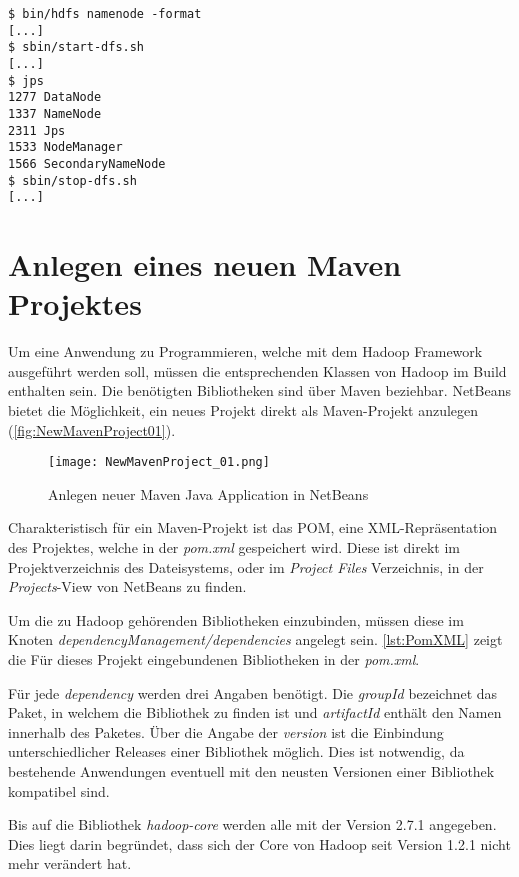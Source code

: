 \begin{lstlisting}[caption=Test der Konfiguration, label=lis:TestenDerKonf]
$ bin/hdfs namenode -format
[...]
$ sbin/start-dfs.sh
[...]
$ jps
1277 DataNode
1337 NameNode
2311 Jps
1533 NodeManager
1566 SecondaryNameNode
$ sbin/stop-dfs.sh
[...]
\end{lstlisting}


\section{Anlegen eines neuen Maven Projektes}
Um eine Anwendung zu Programmieren, welche mit dem Hadoop Framework ausgeführt werden soll, müssen die entsprechenden Klassen von Hadoop im Build enthalten sein. Die benötigten Bibliotheken sind über \gls{Maven} beziehbar. \gls{NetBeans} bietet die Möglichkeit, ein neues Projekt direkt als \gls{Maven}-Projekt anzulegen (\autoref{fig:NewMavenProject01}).

\begin{figure}[h]
	\texttt{[image: NewMavenProject\_01.png]}
	\caption{Anlegen neuer Maven Java Application in NetBeans}
	\label{fig:NewMavenProject01}
\end{figure}

Charakteristisch für ein \gls{Maven}-Projekt ist das \ac{POM}, eine XML-Repräsentation des Projektes, welche in der \textit{pom.xml} gespeichert wird. Diese ist direkt im Projektverzeichnis des Dateisystems, oder im \textit{Project Files} Verzeichnis, in der \textit{Projects}-View von \gls{NetBeans} zu finden.

Um die zu Hadoop gehörenden Bibliotheken einzubinden, müssen diese im Knoten \textit{dependencyManagement/dependencies} angelegt sein. \autoref{lst:PomXML} zeigt die Für dieses Projekt eingebundenen Bibliotheken in der \textit{pom.xml}.

Für jede \textit{dependency} werden drei Angaben benötigt. Die \textit{groupId} bezeichnet das Paket, in welchem die Bibliothek zu finden ist und \textit{artifactId} enthält den Namen innerhalb des Paketes. Über die Angabe der \textit{version} ist die Einbindung unterschiedlicher Releases einer Bibliothek möglich. Dies ist notwendig, da bestehende Anwendungen eventuell  mit den neusten Versionen einer Bibliothek kompatibel sind.

Bis auf die Bibliothek \textit{hadoop-core} werden alle mit der Version 2.7.1 angegeben. Dies liegt darin begründet, dass sich der Core von Hadoop seit Version 1.2.1 nicht mehr verändert hat. \\

